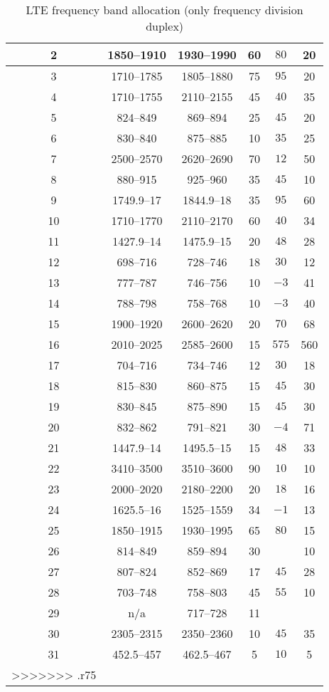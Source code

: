 \begin{table}[]
\begin{tabular}{|c|c|c|c|c|c|}
    2  & 1850--1910 & 1930--1990 & 60 & $80$  & 20  \\ \hline
    3  & 1710--1785 & 1805--1880 & 75 & $95$  & 20  \\ \hline
    4  & 1710--1755 & 2110--2155 & 45 & $40$  & 35  \\ \hline
    5  & 824--849   & 869--894   & 25 & $45$  & 20  \\ \hline
    6  & 830--840   & 875--885   & 10 & $35$  & 25  \\ \hline
    7  & 2500--2570 & 2620--2690 & 70 & $12$  & 50  \\ \hline
    8  & 880--915   & 925--960   & 35 & $45$  & 10  \\ \hline
    9  & 1749.9--17 & 1844.9--18 & 35 & $95$  & 60  \\ \hline
    10 & 1710--1770 & 2110--2170 & 60 & $40$  & 34  \\ \hline
    11 & 1427.9--14 & 1475.9--15 & 20 & $48$  & 28  \\ \hline
    12 & 698--716   & 728--746   & 18 & $30$  & 12  \\ \hline
    13 & 777--787   & 746--756   & 10 & $-3$  & 41  \\ \hline
    14 & 788--798   & 758--768   & 10 & $-3$  & 40  \\ \hline
    15 & 1900--1920 & 2600--2620 & 20 & $70$  & 68  \\ \hline
    16 & 2010--2025 & 2585--2600 & 15 & $575$ & 560 \\ \hline
    17 & 704--716   & 734--746   & 12 & $30$  & 18  \\ \hline
    18 & 815--830   & 860--875   & 15 & $45$  & 30  \\ \hline
    19 & 830--845   & 875--890   & 15 & $45$  & 30  \\ \hline
    20 & 832--862   & 791--821   & 30 & $-4$  &  71  \\ \hline
    21 & 1447.9--14 & 1495.5--15 & 15 & $48$  & 33  \\ \hline
    22 & 3410--3500 & 3510--3600 & 90 & $10$  & 10  \\ \hline
    23 & 2000--2020 & 2180--2200 & 20 & $18$  & 16  \\ \hline
    24 & 1625.5--16 & 1525--1559 & 34 & $-1$  & 13  \\ \hline
    25 & 1850--1915 & 1930--1995 & 65 & $80$  & 15  \\ \hline
    26 & 814--849   & 859--894   & 30 &       & 10  \\ \hline
    27 & 807--824   & 852--869   & 17 & $45$  & 28  \\ \hline
    28 & 703--748   & 758--803   & 45 & $55$  & 10  \\ \hline
    29 & n/a        & 717--728   & 11 &       & \\ \hline
    30 & 2305--2315 & 2350--2360 & 10 & $45$  & 35  \\ \hline
    31 & 452.5--457 & 462.5--467 & 5  & $10$  & 5   \\ \hline
>>>>>>> .r75
  \end{tabular}
  \caption{LTE frequency band allocation (only frequency division duplex) \cite{radio2015electronics}}
  \label{tab:ltefreqband}
\end{table}

